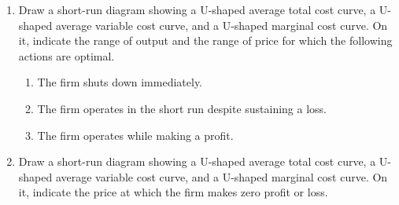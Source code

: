 \documentclass{article}
\begin{document}
\begin{enumerate}
\begin{enumerate}
	\item Find $Q$ at which $P = \underline{\phantom{MC}}$.
	
	\item If $P < \underline{\phantom{AVC}}$, shut down immediately and remain out of business.
	
	\item If $\underline{\phantom{AVC}} < P < \underline{\phantom{ATC}}$, operate in the short run but exit in the long run.
	
	\item If $\underline{\phantom{ATC}} < P$, stay in business and enjoy your profits!
	
	\end{enumerate}

\item Draw a short-run diagram showing a U-shaped average total cost curve, a U-shaped average variable cost curve, and a U-shaped marginal cost curve. On it, indicate the range of output and the range of price for which the following actions are optimal.

	\begin{enumerate}
	
	\item The firm shuts down immediately.
	
	\item The firm operates in the short run despite sustaining a loss.
	
	\item The firm operates while making a profit. 
	
	\end{enumerate}
	
\item Draw a short-run diagram showing a U-shaped average total cost curve, a U-shaped average variable cost curve, and a U-shaped marginal cost curve. On it, indicate the price at which the firm makes zero profit or loss.

\end{enumerate}
\end{document}

